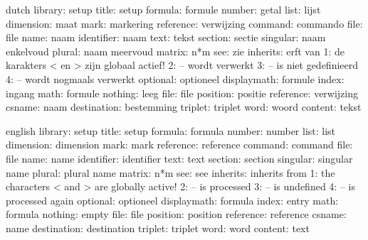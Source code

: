 
%
%

\usemodule[set-02]

\unprotect


\def\setupnumfont  {}
\def\setuptxtfont  {}
\def\setupintfont#1{\uppercase{#1}}
\def\setupvarfont  {\sl}
\def\setupoptfont  {\sl}
\def\setupalwcolor {}
\def\setupoptcolor {darkgray}

  {\ignorespaces}

\startmessages  dutch  library: setup
        title:  setup
      formula:  formule
       number:  getal
         list:  lijst
    dimension:  maat
         mark:  markering
    reference:  verwijzing
      command:  commando
         file:  file
         name:  naam
   identifier:  naam
         text:  tekst
      section:  sectie
     singular:  naam enkelvoud
       plural:  naam meervoud
       matrix:  n*m
          see:  zie
     inherits:  erft van
            1:  de karakters < en > zijn globaal actief!
            2:  -- wordt verwerkt
            3:  -- is niet gedefinieerd
            4:  -- wordt nogmaals verwerkt
     optional:  optioneel
  displaymath:  formule
        index:  ingang
         math:  formule
      nothing:  leeg
         file:  file
     position:  positie
    reference:  verwijzing
       csname:  naam
  destination:  bestemming
      triplet:  triplet
         word:  woord
      content:  tekst
\stopmessages

\startmessages  english  library: setup
        title:  setup
      formula:  formula
       number:  number
         list:  list
    dimension:  dimension
         mark:  mark
    reference:  reference
      command:  command
         file:  file
         name:  name
   identifier:  identifier
         text:  text
      section:  section
     singular:  singular name
       plural:  plural name
       matrix:  n*m
          see:  see
     inherits:  inherits from
            1:  the characters < and > are globally active!
            2:  -- is processed
            3:  -- is undefined
            4:  -- is processed again
     optional:  optioneel
  displaymath:  formula
        index:  entry
         math:  formula
      nothing:  empty
         file:  file
     position:  position
    reference:  reference
       csname:  name
  destination:  destination
      triplet:  triplet
         word:  word
      content:  text
\stopmessages

